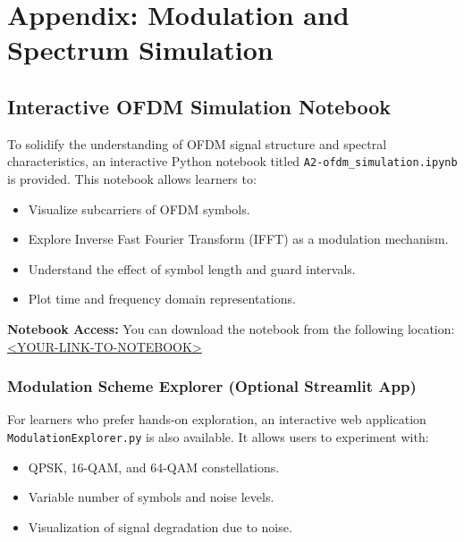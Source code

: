 
\chapter{Appendix: Modulation and Spectrum Simulation}

\section{Interactive OFDM Simulation Notebook}

To solidify the understanding of OFDM signal structure and spectral characteristics, an interactive Python notebook titled \texttt{A2-ofdm\_simulation.ipynb} is provided. This notebook allows learners to:

\begin{itemize}
  \item Visualize subcarriers of OFDM symbols.
  \item Explore Inverse Fast Fourier Transform (IFFT) as a modulation mechanism.
  \item Understand the effect of symbol length and guard intervals.
  \item Plot time and frequency domain representations.
\end{itemize}

\textbf{Notebook Access:}  
You can download the notebook from the following location:  
\url{<YOUR-LINK-TO-NOTEBOOK>}

\subsection{Modulation Scheme Explorer (Optional Streamlit App)}

For learners who prefer hands-on exploration, an interactive web application \texttt{ModulationExplorer.py} is also available. It allows users to experiment with:

\begin{itemize}
  \item QPSK, 16-QAM, and 64-QAM constellations.
  \item Variable number of symbols and noise levels.
  \item Visualization of signal degradation due to noise.
\end{itemize}

